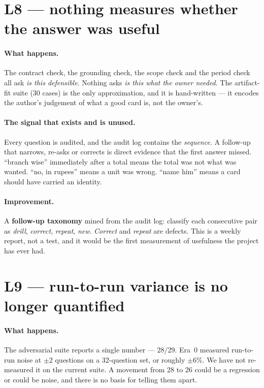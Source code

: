 \documentclass[11pt,a4paper]{report}
\begin{document}
\section{L8 --- nothing measures whether the answer was useful}

\paragraph{What happens.} The contract check, the grounding check, the scope check and the period
check all ask \emph{is this defensible}. Nothing asks \emph{is this what the owner needed}. The
artifact-fit suite (30 cases) is the only approximation, and it is hand-written --- it encodes the
author's judgement of what a good card is, not the owner's.

\paragraph{The signal that exists and is unused.} Every question is audited, and the audit log
contains the \emph{sequence}. A follow-up that narrows, re-asks or corrects is direct evidence that
the first answer missed. ``branch wise'' immediately after a total means the total was not what was
wanted. ``no, in rupees'' means a unit was wrong. ``name him'' means a card should have carried an
identity.

\paragraph{Improvement.} A \textbf{follow-up taxonomy} mined from the audit log: classify each
consecutive pair as \emph{drill}, \emph{correct}, \emph{repeat}, \emph{new}. \emph{Correct} and
\emph{repeat} are defects. This is a weekly report, not a test, and it would be the first
measurement of usefulness the project has ever had.

\section{L9 --- run-to-run variance is no longer quantified}

\paragraph{What happens.} The adversarial suite reports a single number --- 28/29. Era~0 measured
run-to-run noise at $\pm$2 questions on a 32-question set, or roughly $\pm$6\%. We have not
re-measured it on the current suite. A movement from 28 to 26 could be a regression or could be
noise, and there is no basis for telling them apart.
\end{document}
